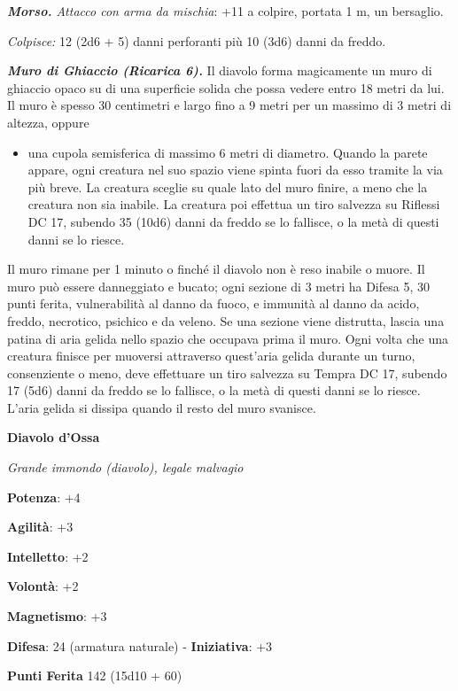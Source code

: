 \begin{multicols}{2}
\emph{\textbf{Morso.} Attacco con arma da mischia}: +11 a colpire,
portata 1 m, un bersaglio.

\emph{Colpisce:} 12 (2d6 + 5) danni perforanti più 10 (3d6) danni da
freddo.




\emph{\textbf{Muro di Ghiaccio (Ricarica 6).}} Il diavolo forma
magicamente un muro di ghiaccio opaco su di una superficie solida che
possa vedere entro 18 metri da lui. Il muro è spesso 30 centimetri e
largo fino a 9 metri per un massimo di 3 metri di altezza, oppure


\begin{itemize}
\item
  una cupola semisferica di massimo 6 metri di diametro. Quando la
  parete appare, ogni creatura nel suo spazio viene spinta fuori da esso
  tramite la via più breve. La creatura sceglie su quale lato del muro
  finire, a meno che la creatura non sia inabile. La creatura poi
  effettua un tiro salvezza su Riflessi DC 17, subendo 35 (10d6) danni
  da freddo se lo fallisce, o la metà di questi danni se lo riesce.
\end{itemize}


Il muro rimane per 1 minuto o finché il diavolo non è reso inabile o
muore. Il muro può essere danneggiato e bucato; ogni sezione di 3 metri
ha Difesa 5, 30 punti ferita, vulnerabilità al danno da fuoco, e immunità al
danno da acido, freddo, necrotico, psichico e da veleno. Se una sezione
viene distrutta, lascia una patina di aria gelida nello spazio che
occupava prima il muro. Ogni volta che una creatura finisce per muoversi
attraverso quest'aria gelida durante un turno, consenziente o meno, deve
effettuare un tiro salvezza su Tempra DC 17, subendo 17 (5d6)
danni da freddo se lo fallisce, o la metà di questi danni se lo riesce.
L'aria gelida si dissipa quando il resto del muro svanisce.


\textbf{Diavolo d'Ossa}

\emph{Grande immondo (diavolo), legale malvagio}

\textbf{Potenza}: +4

\textbf{Agilità}: +3

\textbf{Intelletto}: +2

\textbf{Volontà}: +2

\textbf{Magnetismo}: +3

\textbf{Difesa}: 24 (armatura naturale) - \textbf{Iniziativa}: +3

\textbf{Punti Ferita} 142 (15d10 + 60)


\end{multicols}
